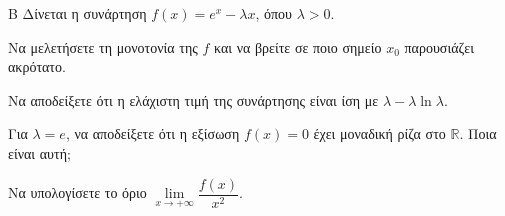 \begin{thema}{Β}
Δίνεται η συνάρτηση $f(x) = e^x - \lambda x$, όπου $\lambda > 0$.
\begin{erwthma}
  \item Να μελετήσετε τη μονοτονία της $f$ και να βρείτε σε ποιο σημείο $x_0$ παρουσιάζει ακρότατο.
  \item Να αποδείξετε ότι η ελάχιστη τιμή της συνάρτησης είναι ίση με $\lambda - \lambda \ln \lambda$.
  \item Για $\lambda = e$, να αποδείξετε ότι η εξίσωση $f(x) = 0$ έχει μοναδική ρίζα στο $\mathbb{R}$. Ποια είναι αυτή;
  \item Να υπολογίσετε το όριο $\lim\limits_{x \to +\infty} \dfrac{f(x)}{x^2}$.
\end{erwthma}
\end{thema}
